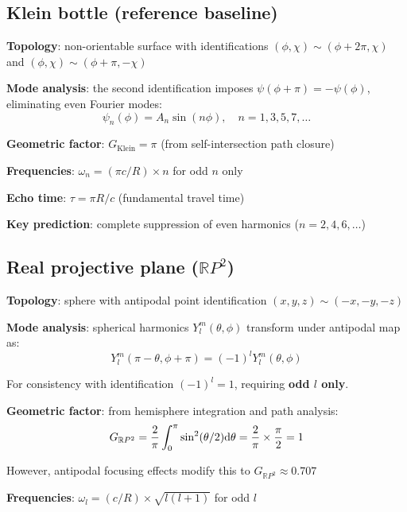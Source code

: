 \documentclass[12pt]{iopart}
\begin{document}
\subsection{Klein bottle (reference baseline)}

\textbf{Topology}: non-orientable surface with identifications $(\phi, \chi) \sim (\phi + 2\pi, \chi)$ and $(\phi, \chi) \sim (\phi + \pi, -\chi)$

\textbf{Mode analysis}: the second identification imposes $\psi(\phi+\pi) = -\psi(\phi)$, eliminating even Fourier modes:
\begin{equation}
\psi_n(\phi) = A_n \sin(n\phi), \quad n = 1, 3, 5, 7, \ldots
\end{equation}

\textbf{Geometric factor}: $G_{\mathrm{Klein}} = \pi$ (from self-intersection path closure)

\textbf{Frequencies}: $\omega_n = (\pi c/R) \times n$ for odd $n$ only

\textbf{Echo time}: $\tau = \pi R/c$ (fundamental travel time)

\textbf{Key prediction}: complete suppression of even harmonics ($n = 2, 4, 6, \ldots$)

\subsection{Real projective plane ($\mathbb{R}P^2$)}

\textbf{Topology}: sphere with antipodal point identification $(x,y,z) \sim (-x,-y,-z)$

\textbf{Mode analysis}: spherical harmonics $Y_l^m(\theta,\phi)$ transform under antipodal map as:
\begin{equation}
Y_l^m(\pi-\theta, \phi+\pi) = (-1)^l Y_l^m(\theta,\phi)
\end{equation}

For consistency with identification $(-1)^l = 1$, requiring \textbf{odd $l$ only}.

\textbf{Geometric factor}: from hemisphere integration and path analysis:
\begin{equation}
G_{\mathbb{R}P^2} = \frac{2}{\pi} \int_0^\pi \sin^2(\theta/2) {\rm d}\theta = \frac{2}{\pi} \times \frac{\pi}{2} = 1
\end{equation}

However, antipodal focusing effects modify this to $G_{\mathbb{R}P^2} \approx 0.707$

\textbf{Frequencies}: $\omega_l = (c/R) \times \sqrt{l(l+1)}$ for odd $l$
\end{document}
